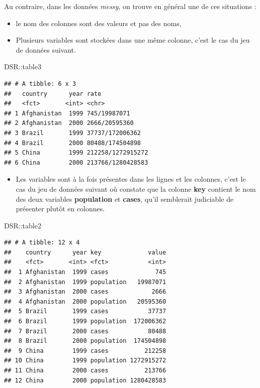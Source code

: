 \documentclass[
]{book}
\newenvironment{Shaded}{\begin{snugshade}}{\end{snugshade}}
\newcommand{\NormalTok}[1]{#1}
\newcommand{\SpecialCharTok}[1]{\textcolor[rgb]{0.00,0.00,0.00}{#1}}
\providecommand{\tightlist}{%
  \setlength{\itemsep}{0pt}\setlength{\parskip}{0pt}}
\theoremstyle{definition}
\theoremstyle{definition}
\theoremstyle{definition}
\theoremstyle{definition}
\theoremstyle{remark}
\begin{document}
Au contraire, dans les données \emph{messy}, on trouve en général une de ces situations :

\begin{itemize}
\item
  le nom des colonnes sont des valeurs et pas des noms,
\item
  Plusieurs variables sont stockées dans une même colonne, c'est le cas du jeu de données suivant.
\end{itemize}

\begin{Shaded}
\begin{Highlighting}[]
\NormalTok{DSR}\SpecialCharTok{::}\NormalTok{table3}
\end{Highlighting}
\end{Shaded}

\begin{verbatim}
## # A tibble: 6 x 3
##   country      year rate             
##   <fct>       <int> <chr>            
## 1 Afghanistan  1999 745/19987071     
## 2 Afghanistan  2000 2666/20595360    
## 3 Brazil       1999 37737/172006362  
## 4 Brazil       2000 80488/174504898  
## 5 China        1999 212258/1272915272
## 6 China        2000 213766/1280428583
\end{verbatim}

\begin{itemize}
\tightlist
\item
  Les variables sont à la fois présentes dans les lignes et les colonnes, c'est le cas du jeu de données suivant où constate que la colonne \textbf{key} contient le nom des deux variables \textbf{population} et \textbf{cases}, qu'il semblerait judiciable de présenter plutôt en colonnes.
\end{itemize}

\begin{Shaded}
\begin{Highlighting}[]
\NormalTok{DSR}\SpecialCharTok{::}\NormalTok{table2}
\end{Highlighting}
\end{Shaded}

\begin{verbatim}
## # A tibble: 12 x 4
##    country      year key             value
##    <fct>       <int> <fct>           <int>
##  1 Afghanistan  1999 cases             745
##  2 Afghanistan  1999 population   19987071
##  3 Afghanistan  2000 cases            2666
##  4 Afghanistan  2000 population   20595360
##  5 Brazil       1999 cases           37737
##  6 Brazil       1999 population  172006362
##  7 Brazil       2000 cases           80488
##  8 Brazil       2000 population  174504898
##  9 China        1999 cases          212258
## 10 China        1999 population 1272915272
## 11 China        2000 cases          213766
## 12 China        2000 population 1280428583
\end{verbatim}
\end{document}

